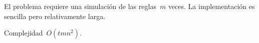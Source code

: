 
El problema requiere una simulación de las reglas~$m$ veces. La implementación es
sencilla pero relativamente larga.

Complejidad~$O(tmn^2)$.

